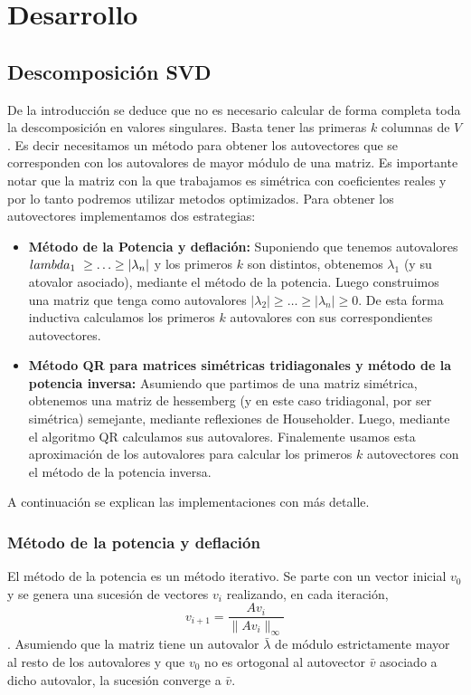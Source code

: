 \section{Desarrollo}

\subsection{Descomposici\'on SVD}

	\PARstart De la introducci\'on se deduce que no es necesario calcular de forma
	completa toda la descomposici\'on en valores singulares. Basta tener
	las primeras $k$ columnas de $V$. Es decir necesitamos un m\'etodo para
	obtener los autovectores que se corresponden con los autovalores de mayor
	m\'odulo de una matriz.
	Es importante notar que la matriz con la que trabajamos es sim\'etrica
	con coeficientes reales y por lo tanto podremos utilizar metodos optimizados.
	Para obtener los autovectores implementamos dos estrategias:

	\begin{itemize}
		\item \textbf{M\'etodo de la Potencia y deflaci\'on:} Suponiendo que
		tenemos autovalores $\\lambda_1\ \geq \ldots \geq |\lambda_n|$ y los primeros
		$k$ son distintos, obtenemos $\lambda_1$ (y su atovalor asociado),
		mediante el m\'etodo de la potencia. Luego
		construimos una matriz que tenga como autovalores
		$|\lambda_2| \geq \ldots \geq |\lambda_n| \geq 0$.
		De esta forma inductiva calculamos los primeros $k$ autovalores
		con sus correspondientes autovectores.

		\item \textbf{M\'etodo QR para matrices sim\'etricas tridiagonales y
		m\'etodo de la potencia inversa:} Asumiendo que partimos de una matriz
		sim\'etrica, obtenemos una matriz de hessemberg (y en este caso
		tridiagonal, por ser sim\'etrica) semejante, mediante reflexiones de
		Householder. Luego, mediante el algoritmo QR calculamos sus
		autovalores. Finalemente usamos esta aproximaci\'on de
		los autovalores para calcular los primeros $k$ autovectores con el m\'etodo
		de la potencia inversa.
	\end{itemize}

	A continuaci\'on se explican las implementaciones con m\'as detalle.

\subsubsection{M\'etodo de la potencia y deflaci\'on}
	El m\'etodo de la potencia es un m\'etodo iterativo. Se parte con un vector
	inicial $v_0$ y se genera una sucesi\'on de vectores ${v_i}$ realizando,
	en cada iteraci\'on, $$v_{i+1} = \frac{Av_i}{\|Av_i\|_{\infty}}$$.
	Asumiendo que la matriz tiene un autovalor $\bar{\lambda}$ de m\'odulo
	estrictamente
	mayor al resto de los autovalores y que $v_0$ no es ortogonal al
	autovector $\bar{v}$ asociado a dicho autovalor, la sucesi\'on converge 
	a $\bar{v}$.

